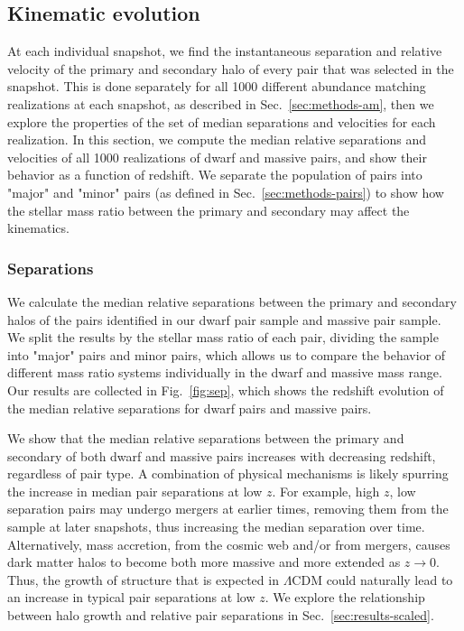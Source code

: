 \documentclass[twocolumn]{aastex631}
\begin{document}
\subsection{Kinematic evolution}\label{sec:results-kinematics}
At each individual snapshot, we find the instantaneous separation and relative velocity of the primary and secondary halo of every pair that was selected in the snapshot. 
This is done separately for all 1000 different abundance matching realizations at each snapshot, as described in Sec.~\ref{sec:methods-am}, then we explore the properties of the set of median separations and velocities for each realization. 
In this section, we compute the median relative separations and velocities of all 1000 realizations of dwarf and massive pairs, and show their behavior as a function of redshift.
We separate the population of pairs into "major" and "minor" pairs (as defined in Sec.~\ref{sec:methods-pairs}) to show how the stellar mass ratio between the primary and secondary may affect the kinematics. 


    \subsubsection{Separations}
    We calculate the median relative separations between the primary and secondary halos of the pairs identified in our dwarf pair sample and massive pair sample. 
    We split the results by the stellar mass ratio of each pair, dividing the sample into "major" pairs and minor pairs, which allows us to compare the behavior of different mass ratio systems individually in the dwarf and massive mass range.
    Our results are collected in Fig.~\ref{fig:sep}, which shows the redshift evolution of the median relative separations for dwarf pairs and massive pairs. 
    
    We show that the median relative separations between the primary and secondary of both dwarf and massive pairs increases with decreasing redshift, regardless of pair type. 
    A combination of physical mechanisms is likely spurring the increase in median pair separations at low $z$. 
    For example, high $z$, low separation pairs may undergo mergers at earlier times, removing them from the sample at later snapshots, thus increasing the median separation over time. 
    Alternatively, mass accretion, from the cosmic web and/or from mergers, causes dark matter halos to become both more massive and more extended as $z\to0$. 
    Thus, the growth of structure that is expected in $\Lambda$CDM could naturally lead to an increase in typical pair separations at low $z$.
    We explore the relationship between halo growth and relative pair separations in Sec.~\ref{sec:results-scaled}.
    
\end{document}
